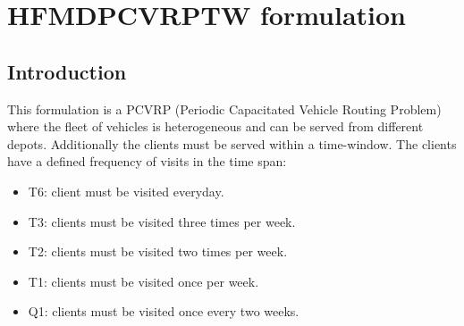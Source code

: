 \documentclass[preprint,review,12pt]{elsarticle}
\begin{document}
\section{HFMDPCVRPTW formulation}

\subsection{Introduction}
This formulation is a PCVRP (Periodic Capacitated Vehicle Routing Problem) where the fleet of vehicles is heterogeneous and can be served from different depots. Additionally the clients must be served within a time-window. The clients have a defined frequency of visits in the time span:

\begin{itemize}
	\item T6: client must be visited everyday.
	\item T3: clients must be visited three times per week.
	\item T2: clients must be visited two times per week.
	\item T1: clients must be visited once per week.
	\item Q1: clients must be visited once every two weeks.
\end{itemize}
\end{document}
